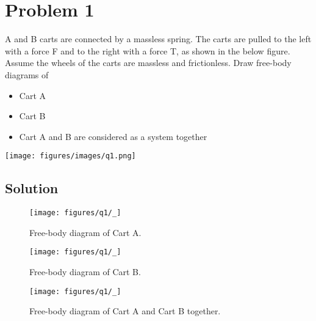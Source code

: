 \section*{Problem 1}

A and B carts are connected by a massless spring.
The carts are pulled to the left with a force F and to the right with a force T, as shown in the below figure.
Assume the wheels of the carts are massless and frictionless.
Draw free-body diagrams of
\begin{itemize}[itemsep=3pt,parsep=0pt,topsep=5pt,partopsep=0pt]
    \item Cart A
    \item Cart B
    \item Cart A and B are considered as a system together
\end{itemize}

\begin{figure*}[h]
    \centering
    \texttt{[image: figures/images/q1.png]}
\end{figure*}

\subsection*{Solution}

\begin{figure}[htbp]
    \centering
    \texttt{[image: figures/q1/\_]}
    \caption{
        Free-body diagram of Cart A.
    }
\end{figure}

\begin{figure}[htbp]
    \centering
    \texttt{[image: figures/q1/\_]}
    \caption{
        Free-body diagram of Cart B.
    }
\end{figure}

\begin{figure}[htbp]
    \centering
    \texttt{[image: figures/q1/\_]}
    \caption{
        Free-body diagram of Cart A and Cart B together.
    }
\end{figure}
